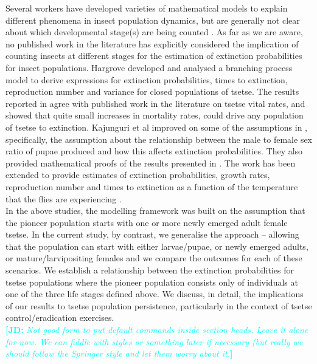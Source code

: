 \documentclass[smallextended]{svjour3}
\newcommand{\comment}[3]{\textcolor{#1}{\textbf{[#2: }\textit{#3}\textbf{]}}}
\newcommand{\jd}[1]{\comment{cyan}{JD}{#1}}
\begin{document}
Several workers have developed varieties of mathematical models to explain different phenomena in insect population dynamics, but are generally not clear about which developmental stage(s) are being counted \cite{Ylioja1999,Artzrouni2003,Hargrove2005a,Adams2005,Barclay2011d,Peck2012a,Lin2015,Kajunguri2019}.  As far as we are aware, no published work in the literature has explicitly considered the implication of counting insects at different stages for the estimation of extinction probabilities for insect populations. Hargrove \cite{Hargrove2005a} developed and analysed a branching process model to derive expressions for extinction probabilities, times to extinction, reproduction number and variance for closed populations of tsetse. The results reported in \cite{Hargrove2005a} agree with published work in the literature on tsetse vital rates, and showed that quite small increases in mortality rates,  could drive any population of tsetse to extinction. Kajunguri et al \cite{Kajunguri2019} improved on some of the assumptions in \cite{Hargrove2005a}, specifically, the assumption about the relationship between the male to female sex ratio of pupae produced and how this affects extinction probabilities. They also provided mathematical proofs of the results presented in \cite{Hargrove2005a}. The work has been extended to provide estimates of extinction probabilities, growth rates, reproduction number and times to extinction as a function of the temperature that the flies are experiencing \cite{Are2019}. \\



In the above studies, the modelling framework was built on the assumption that the pioneer population starts with one or more newly emerged adult female tsetse. In the current study, by contrast, we  generalise the approach – allowing that the population can start with either larvae/pupae, or newly emerged adults, or mature/larvipositing females and we compare the outcomes for each of these scenarios. We establish a relationship between the extinction probabilities for tsetse populations where the pioneer population consists only of individuals at one of the three life stages defined above. We discuss, in detail, the implications of our results to tsetse population persistence, particularly in the context of tsetse control/eradication exercises. \\


\jd{Not good form to put default commands inside section heads. Leave it alone for now. We can fiddle with styles or something later if necessary (but really we should follow the Springer style and let them worry about it.}
\end{document}

